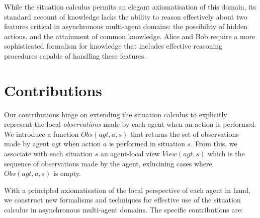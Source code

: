 While the situation calculus permits an elegant axiomatisation of
this domain, its standard account of knowledge lacks the ability to
reason effectively about two features critical in asynchronous multi-agent
domains: the possibility of hidden actions, and the attainment of
common knowledge. Alice and Bob require a more sophisticated formalism
for knowledge that includes effective reasoning procedures capable
of handling these features.


\section{Contributions}

Our contributions hinge on extending the situation calculus to explicitly
represent the local \emph{observations} made by each agent when an
action is performed. We introduce a function $Obs(agt,a,s)$ that
returns the set of observations made by agent $agt$ when action $a$
is performed in situation $s$. From this, we associate with each
situation $s$ an agent-local view $View(agt,s)$ which is the sequence
of observations made by the agent, exlucining cases where $Obs(agt,a,s)$
is empty.

With a principled axiomatisation of the local perspective of each
agent in hand, we construct new formalisms and techniques for effective
use of the situation calculus in asynchronous multi-agent domains.
The specific contributions are:

